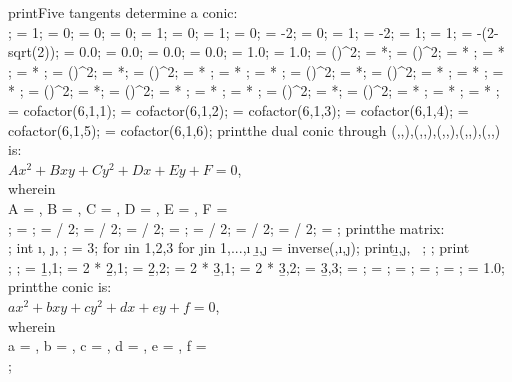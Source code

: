 \documentclass[tikz,border=10pt]{standalone}
\begin{document}
{  %
  print{Five tangents determine a conic:\\};
   = 1;   = 0;  = 0;
   = 0;   = 1;  = 0;
   = 1;   = 0;  = -2;
   = 0;   = 1;  = -2;
   = 1;   = 1;  = -(2-sqrt(2));
   = 0.0;      = 0.0;      = 0.0;      = 0.0;        = 1.0;        = 1.0;
   = ()^2;  = *;  = ()^2;  =  * ;  =  * ;  =  * ; 
   = ()^2;  = *;  = ()^2;  =  * ;  =  * ;  =  * ; 
   = ()^2;  = *;  = ()^2;  =  * ;  =  * ;  =  * ; 
   = ()^2;  = *;  = ()^2;  =  * ;  =  * ;  =  * ; 
   = ()^2;  = *;  = ()^2;  =  * ;  =  * ;  =  * ; 
  \A = cofactor(6,1,1);
  \B = cofactor(6,1,2);
  \C = cofactor(6,1,3);
  \D = cofactor(6,1,4);
  \E = cofactor(6,1,5);
  \F = cofactor(6,1,6);
  print{the dual conic through (,,),(,,),(,,),(,,),(,,) is:\\$Ax^2+Bxy+Cy^2+Dx+Ey+F=0$, \\wherein\\ A = \A, B = \B, C = \C, D = \D, E = \E, F = \F \\};
   = \A;      = \B / 2;  = \D / 2;
   = \B / 2;  = \C;      = \E / 2;
   = \D / 2;  = \E / 2;  = \F;
  print{the matrix:\\};
  int \i, \j, \n;
  \n = 3;
  for \i in {1,2,3}{
    for \j in {1,...,\i}{
      \b{\i,\j} = inverse(\n,\i,\j);
      print{\b{\i,\j}, \ };
    };
    print{\\};
  };
  \A = \b{1,1}; 
  \B = 2 * \b{2,1};
  \C = \b{2,2};
  \D = 2 * \b{3,1};
  \E = 2 * \b{3,2};
  \F = \b{3,3};
  \A = \fpeval{\A / \F}; 
  \B = \fpeval{\B / \F};
  \C = \fpeval{\C / \F};
  \D = \fpeval{\D / \F};
  \E = \fpeval{\E / \F};
  \F = 1.0;
  print{the conic is:\\$ax^2+bxy+cy^2+dx+ey+f=0$, \\wherein\\ a = \A, b = \B, c = \C, d = \D, e = \E, f = \F \\};
}
\end{document}
